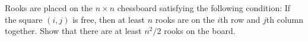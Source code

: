 Rooks are placed on the $n \times n$ chessboard satisfying the following condition: If the square $(i, j)$ is free, then at least $n$ rooks are on the $i$th row and $j$th column together. Show that there are at least $n^2/2$ rooks on the board.

